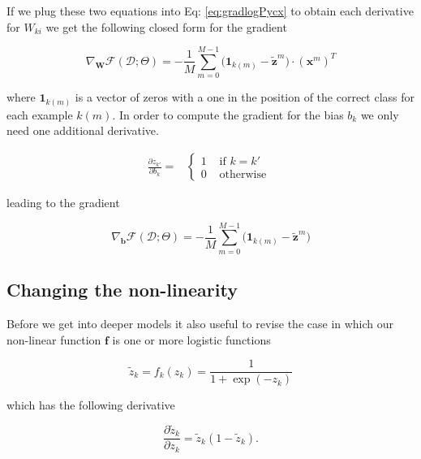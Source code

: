 If we plug these two equations into Eq: \ref{eq:gradlogPycx} to obtain each 
derivative for $W_{ki}$ we get the following closed form for the gradient

\begin{equation}
\nabla_\mathbf{W}\mathcal{F}(\mathcal{D};\Theta) = -\frac{1}{M}\sum_{m=0}^{M-1} \Big(\mathrm{\mathbf{1}}_{k(m)} - \tilde{\mathbf{z}}^m \Big) \cdot \left(\mathbf{x}^m\right)^T  
\label{gradWeigths}
\end{equation}

\noindent where $\mathrm{\mathbf{1}}_{k(m)}$ is a vector of zeros with a one in
the position of the correct class for each example $k(m)$. In order to compute
the gradient for the bias $b_{k}$  we only need one additional derivative.

\begin{align}
\frac{\partial z_{k'}}{\partial b_{k}} = 
  &\begin{cases}
      1  &  \mbox{ if } k = k'\\ 
      0  &  \mbox{ otherwise } 
  \end{cases} 
  \label{eqn:eqsilonq}
\end{align}
	
\noindent leading to the gradient

\begin{equation}
\nabla_\mathbf{b}\mathcal{F}(\mathcal{D};\Theta) = -\frac{1}{M}\sum_{m=0}^{M-1} \Big(\mathrm{\mathbf{1}}_{k(m)} - \tilde{\mathbf{z}}^m \Big)   
\label{eq:gradBias}
\end{equation}

\subsection{Changing the non-linearity}

Before we get into deeper models it also useful to revise the case in which our
non-linear function $\mathbf{f}$ is one or more logistic functions

\begin{equation}
\tilde{z}_k = f_k(z_k) = \frac{1}{1+\exp(-z_k)} 
\label{eq:sigmoid}
\end{equation}

which has the following derivative

\begin{equation}
\frac{\partial \tilde{z}_k}{\partial z_k} = \tilde{z}_{k} (1-\tilde{z}_{k}).
\label{eq:partsigmoid}
\end{equation}

